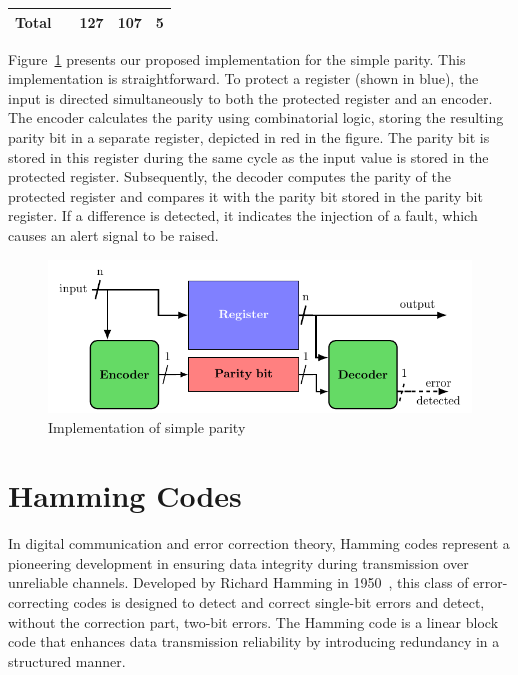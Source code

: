 \begin{table}[t]
\begin{tabular}{@{}ccccc@{}}
        Total   &                                                                                                   & 127                                                      & 107                                                                & 5                                                               \\
        \bottomrule
    \end{tabular}
\end{table}

Figure~\ref{fig:implementation_sp} presents our proposed implementation for the simple parity. This implementation is straightforward. To protect a register (shown in blue), the input is directed simultaneously to both the protected register and an encoder. The encoder calculates the parity using combinatorial logic, storing the resulting parity bit in a separate register, depicted in red in the figure. The parity bit is stored in this register during the same cycle as the input value is stored in the protected register. Subsequently, the decoder computes the parity of the protected register and compares it with the parity bit stored in the parity bit register. If a difference is detected, it indicates the injection of a fault, which causes an alert signal to be raised.

\begin{figure}[ht]
    \centering
    \includegraphics[page=1]{c5_countermeasures_dift/img/archi_contremesures.pdf}
    \caption{Implementation of simple parity}
    \label{fig:implementation_sp}
\end{figure}

\section{Hamming Codes}
\label{chapter:hammingcode}

In digital communication and error correction theory, Hamming codes represent a pioneering development in ensuring data integrity during transmission over unreliable channels. Developed by Richard Hamming in 1950~\cite{H-50-bstj}, this class of error-correcting codes is designed to detect and correct single-bit errors and detect, without the correction part, two-bit errors. The Hamming code is a linear block code that enhances data transmission reliability by introducing redundancy in a structured manner.

